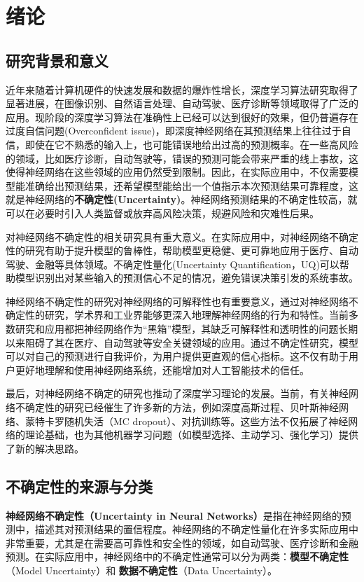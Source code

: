\chapter{绪论}
\section{研究背景和意义}
近年来随着计算机硬件的快速发展和数据的爆炸性增长，深度学习算法研究取得了显著进展，在图像识别\cite{krizhevsky2012imagenet}、自然语言处理\cite{brown2020language}、自动驾驶\cite{teichmann2018multinet}、医疗诊断\cite{gulshan2016development}等领域取得了广泛的应用。现阶段的深度学习算法在准确性上已经可以达到很好的效果，但仍普遍存在过度自信问题(Overconfident issue)，即深度神经网络在其预测结果上往往过于自信，即使在它不熟悉的输入上，也可能错误地给出过高的预测概率。在一些高风险的领域，比如医疗诊断，自动驾驶等，错误的预测可能会带来严重的线上事故，这使得神经网络在这些领域的应用仍然受到限制。因此，在实际应用中，不仅需要模型能准确给出预测结果，还希望模型能给出一个值指示本次预测结果可靠程度，这就是神经网络的\textbf{不确定性(Uncertainty)}。神经网络预测结果的不确定性较高，就可以在必要时引入人类监督或放弃高风险决策，规避风险和灾难性后果。

对神经网络不确定性的相关研究具有重大意义。在实际应用中，对神经网络不确定性的研究有助于提升模型的鲁棒性，帮助模型更稳健、更可靠地应用于医疗、自动驾驶、金融等具体领域。不确定性量化(Uncertainty Quantification，UQ)可以帮助模型识别出对某些输入的预测信心不足的情况，避免错误决策引发的系统事故。

神经网络不确定性的研究对神经网络的可解释性也有重要意义，通过对神经网络不确定性的研究，学术界和工业界能够更深入地理解神经网络的行为和特性。当前多数研究和应用都把神经网络作为“黑箱”模型，其缺乏可解释性和透明性的问题长期以来阻碍了其在医疗、自动驾驶等安全关键领域的应用\cite{ROY201911}\cite{christoph2020interpretable}。通过不确定性研究，模型可以对自己的预测进行自我评价，为用户提供更直观的信心指标。这不仅有助于用户更好地理解和使用神经网络系统，还能增加对人工智能技术的信任。

最后，对神经网络不确定的研究也推动了深度学习理论的发展。当前，有关神经网络不确定性的研究已经催生了许多新的方法，例如深度高斯过程、贝叶斯神经网络、蒙特卡罗随机失活（MC dropout）、对抗训练等。这些方法不仅拓展了神经网络的理论基础，也为其他机器学习问题（如模型选择、主动学习、强化学习）提供了新的解决思路。



\section{不确定性的来源与分类}
\textbf{神经网络不确定性（Uncertainty in Neural Networks）}是指在神经网络的预测中，描述其对预测结果的置信程度\cite{abdar2021review}。神经网络的不确定性量化在许多实际应用中非常重要，尤其是在需要高可靠性和安全性的领域，如自动驾驶、医疗诊断和金融预测\cite{gawlikowski2023survey}\cite{he2023survey}\cite{gal2016uncertainty}。在实际应用中，神经网络中的不确定性通常可以分为两类\cite{abdar2021review}：\textbf{模型不确定性}（Model Uncertainty）和\textbf{ 数据不确定性}（Data Uncertainty）。

